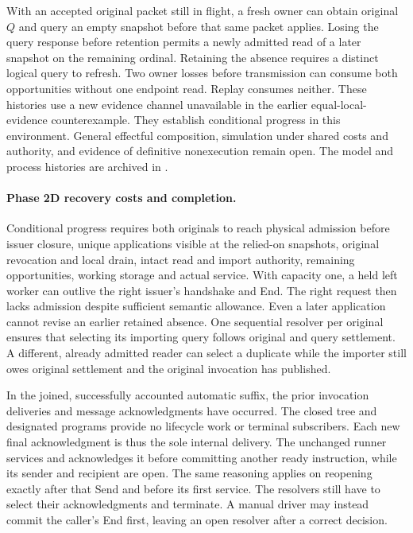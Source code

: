 \documentclass[11pt,a4paper]{article}
\theoremstyle{definition}
\theoremstyle{remark}
\begin{document}
With an accepted original packet still in flight, a fresh owner can obtain original $Q$ and query an empty snapshot before that same packet applies. Losing the query response before retention permits a newly admitted read of a later snapshot on the remaining ordinal. Retaining the absence requires a distinct logical query to refresh. Two owner losses before transmission can consume both opportunities without one endpoint read. Replay consumes neither. These histories use a new evidence channel unavailable in the earlier equal-local-evidence counterexample. They establish conditional progress in this environment. General effectful composition, simulation under shared costs and authority, and evidence of definitive nonexecution remain open. The model and process histories are archived in .

\paragraph{Phase 2D recovery costs and completion.} Conditional progress requires both originals to reach physical admission before issuer closure, unique applications visible at the relied-on snapshots, original revocation and local drain, intact read and import authority, remaining opportunities, working storage and actual service. With capacity one, a held left worker can outlive the right issuer's handshake and End. The right request then lacks admission despite sufficient semantic allowance. Even a later application cannot revise an earlier retained absence. One sequential resolver per original ensures that selecting its importing query follows original and query settlement. A different, already admitted reader can select a duplicate while the importer still owes original settlement and the original invocation has published.

In the joined, successfully accounted automatic suffix, the prior invocation deliveries and message acknowledgments have occurred. The closed tree and designated programs provide no lifecycle work or terminal subscribers. Each new final acknowledgment is thus the sole internal delivery. The unchanged runner services and acknowledges it before committing another ready instruction, while its sender and recipient are open. The same reasoning applies on reopening exactly after that Send and before its first service. The resolvers still have to select their acknowledgments and terminate. A manual driver may instead commit the caller's End first, leaving an open resolver after a correct decision.
\end{document}
